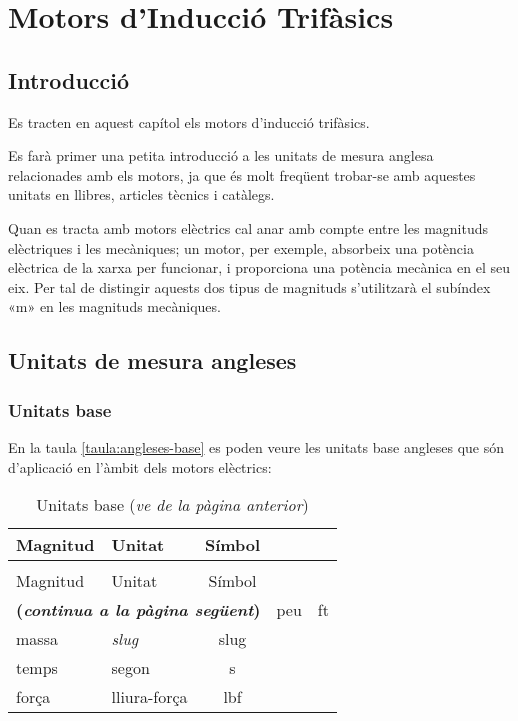 \chapter{Motors d'Inducció Trifàsics}\label{sec:ch-motors-ind}

\section{Introducció}

Es tracten en aquest capítol els motors d'inducció trifàsics.

Es farà primer una petita introducció a les unitats de mesura anglesa relacionades amb els motors, ja que és molt freqüent trobar-se amb aquestes unitats en llibres, articles tècnics i catàlegs.

Quan es tracta amb motors elèctrics cal anar amb compte entre les magnituds elèctriques i les mecàniques; un motor, per exemple, absorbeix una potència elèctrica de la xarxa per funcionar, i proporciona una potència mecànica en el seu eix. Per tal de distingir aquests dos tipus de magnituds s'utilitzarà el subíndex «m» en les magnituds mecàniques.

\section{Unitats de mesura angleses}

\subsection{Unitats base}

En la taula \vref{taula:angleses-base} es poden veure les unitats base angleses que són d'aplicació en l'àmbit dels motors elèctrics:
\begin{longtable}[h]{llc}
   \caption{\label{taula:angleses-base}Unitats angleses base}\\
   \toprule[1pt]
    Magnitud & Unitat & Símbol \\
   \midrule
   \endfirsthead
   \caption[]{Unitats base (\emph{ve de la pàgina anterior})}\\
   \toprule[1pt]
    Magnitud & Unitat & Símbol \\
   \midrule
   \endhead
   \midrule
   \multicolumn{3}{r}{\sffamily\bfseries\color{NavyBlue}(\emph{continua a la pàgina següent})}
   \endfoot
   \endlastfoot
   longitud & peu & ft \\
   massa & \textit{slug} & slug \\
   temps & segon & s\\
   força & lliura-força & lbf \\
   \bottomrule[1pt]
\end{longtable}

